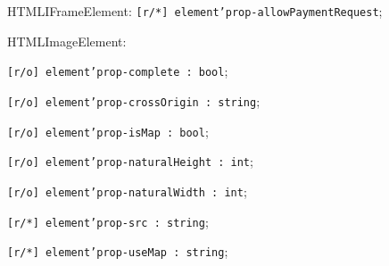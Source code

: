 \begin{icItems}
	\item HTMLIFrameElement: \texttt{[r/*] element'prop-allowPaymentRequest};
	
	\item HTMLImageElement:
	\begin{icItems}
		\item \texttt{[r/o] element'prop-complete : bool};
		\item \texttt{[r/o] element'prop-crossOrigin : string};
		\item \texttt{[r/o] element'prop-isMap : bool};
		\item \texttt{[r/o] element'prop-naturalHeight : int};
		\item \texttt{[r/o] element'prop-naturalWidth : int};
		\item \texttt{[r/*] element'prop-src : string};
		\item \texttt{[r/*] element'prop-useMap : string};
	\end{icItems}
	

\end{icItems}
